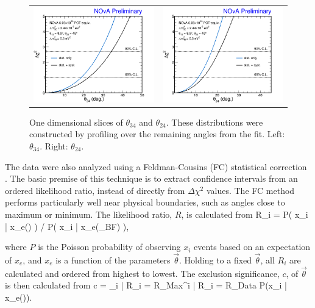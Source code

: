 \begin{figure}[htbp]
  \centering
  \begin{tabular}{c c}
    \includegraphics[width=.47\textwidth]{figures/Fits/1DTh34.png} &
    \includegraphics[width=.47\textwidth]{figures/Fits/1DTh24.png} \\
  \end{tabular}
  \caption[One Dimensional $\theta_{34}$ and $\theta_{24}$ Slices]{One dimensional slices of $\theta_{34}$ and $\theta_{24}$. These distributions were constructed by profiling over the remaining angles from the fit. Left: $\theta_{34}$. Right: $\theta_{24}$.}
  \label{fig:Fit1D}
\end{figure}

The data were also analyzed using a Feldman-Cousins (FC) statistical correction \cite{ref:FC}. The basic premise of this technique is to extract confidence intervals from an ordered likelihood ratio, instead of directly from $\Delta\chi^2$ values. The FC method performs particularly well near physical boundaries, such as angles close to maximum or minimum. The likelihood ratio, $R$, is calculated from
\beq
R_{i} = P\left( x_i | x_e\left(\vec{\theta}\right) \right) / P\left( x_i | x_e\left(\vec{\theta}_{BF}\right) \right),
\label{eq:FCRank}
\eeq

\n where $P$ is the Poisson probability of observing $x_i$ events based on an expectation of $x_e$, and $x_e$ is a function of the parameters $\vec{\theta}$. Holding to a fixed $\vec{\theta}$, all $R_i$ are calculated and ordered from highest to lowest. The exclusion significance, $c$, of $\vec{\theta}$ is then calculated from
\beq
c = \sum_{i | R_i = R_{Max}}^{i | R_i = R_{Data}} P\left(x_i | x_e\left(\vec{\theta}\right)\right).
\label{eq:FCConf}
\eeq

